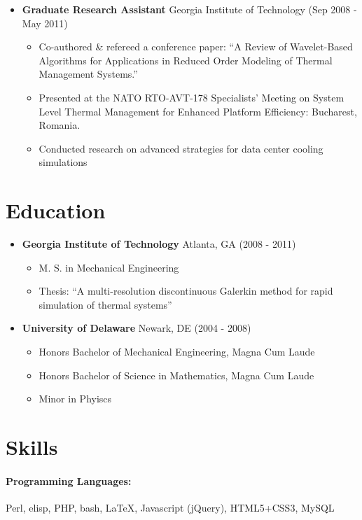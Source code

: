 \documentclass[10pt]{article}
\newenvironment{myitem}{
  \begin{itemize}
    \setlength{\itemsep}{1pt}
    \setlength{\parskip}{0pt}
    \setlength{\parsep}{0pt}
}{\end{itemize}}
\newcommand{\headerrow}[3] {
  \item \textbf{#1} #2 \hfill (#3)
}
\begin{document}
\begin{itemize}
\headerrow {Graduate Research Assistant}{Georgia Institute of Technology}{Sep 2008 - May 2011}
  \begin{myitem}
  \item Co-authored \& refereed a conference paper: ``A Review of Wavelet-Based Algorithms for
    Applications in Reduced Order Modeling of Thermal Management Systems.''
  \item Presented at the NATO RTO-AVT-178 Specialists' Meeting on System Level Thermal Management
    for Enhanced Platform Efficiency: Bucharest, Romania.
  \item Conducted research on advanced strategies for data center cooling simulations
  \end{myitem}
\end{itemize}

\section{Education}
%
\begin{itemize}
\headerrow {Georgia Institute of Technology}{Atlanta, GA}{2008 - 2011}
  \begin{myitem}
  \item M. S. in Mechanical Engineering
  \item Thesis: ``A multi-resolution discontinuous Galerkin method for rapid simulation of thermal systems''
  \end{myitem}
\headerrow {University of Delaware}{Newark, DE}{2004 - 2008}
  \begin{myitem}
  \item Honors Bachelor of Mechanical Engineering, Magna Cum Laude
  \item Honors Bachelor of Science in Mathematics, Magna Cum Laude
  \item Minor in Phyiscs
%
%
  \end{myitem}
\end{itemize}
%
\section{Skills}
%
\paragraph{Programming Languages:} Perl, elisp, PHP, bash, \LaTeX, Javascript (jQuery), HTML5+CSS3, MySQL
\end{document}
